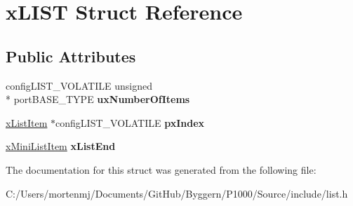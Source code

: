 \hypertarget{structx_l_i_s_t}{\section{x\-L\-I\-S\-T Struct Reference}
\label{structx_l_i_s_t}
}
\subsection*{Public Attributes}
\begin{DoxyCompactItemize}
\item 
\hypertarget{structx_l_i_s_t_a268fd44743a3b6d3cd4dd36a72a678fa}{config\-L\-I\-S\-T\-\_\-\-V\-O\-L\-A\-T\-I\-L\-E unsigned \\*
port\-B\-A\-S\-E\-\_\-\-T\-Y\-P\-E {\bfseries ux\-Number\-Of\-Items}}\label{structx_l_i_s_t_a268fd44743a3b6d3cd4dd36a72a678fa}

\item 
\hypertarget{structx_l_i_s_t_a7d75e67f799b751c7e37820df2172f63}{\hyperlink{structx_l_i_s_t___i_t_e_m}{x\-List\-Item} $\ast$config\-L\-I\-S\-T\-\_\-\-V\-O\-L\-A\-T\-I\-L\-E {\bfseries px\-Index}}\label{structx_l_i_s_t_a7d75e67f799b751c7e37820df2172f63}

\item 
\hypertarget{structx_l_i_s_t_a919ec0b26ba08c9787675b6161f7e318}{\hyperlink{structx_m_i_n_i___l_i_s_t___i_t_e_m}{x\-Mini\-List\-Item} {\bfseries x\-List\-End}}\label{structx_l_i_s_t_a919ec0b26ba08c9787675b6161f7e318}

\end{DoxyCompactItemize}


The documentation for this struct was generated from the following file\-:\begin{DoxyCompactItemize}
\item 
C\-:/\-Users/mortenmj/\-Documents/\-Git\-Hub/\-Byggern/\-P1000/\-Source/include/list.\-h\end{DoxyCompactItemize}
